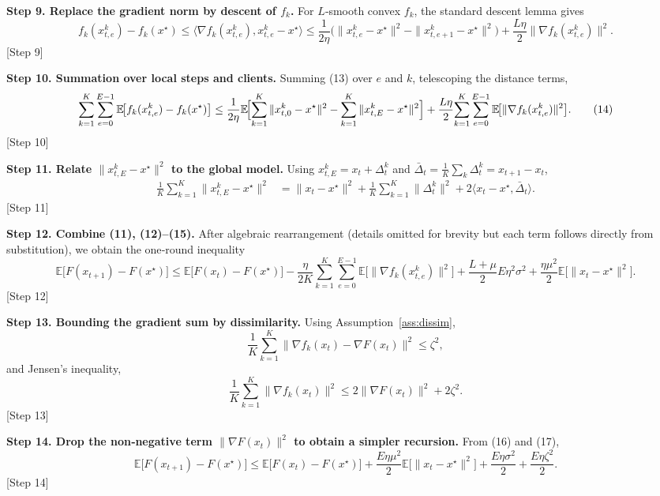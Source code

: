 \documentclass{article}
\newcommand{\EE}{\mathbb{E}}
\newcommand{\prox}{\mu}
\begin{document}
\noindent\textbf{Step 9. Replace the gradient norm by descent of $f_k$.}
For $L$‑smooth convex $f_k$, the standard descent lemma gives
\[
f_k(x_{t,e}^{k})-f_k(x^\star)
\le
\langle\nabla f_k(x_{t,e}^{k}),x_{t,e}^{k}-x^\star\rangle
\le
\frac{1}{2\eta}\bigl(\|x_{t,e}^{k}-x^\star\|^{2}
-\|x_{t,e+1}^{k}-x^\star\|^{2}\bigr)
+\frac{L\eta}{2}\|\nabla f_k(x_{t,e}^{k})\|^{2}.
\tag{13}
\] 
[Step 9]

\noindent\textbf{Step 10. Summation over local steps and clients.}
Summing (13) over $e$ and $k$, telescoping the distance terms,
\[
\sum_{k=1}^{K}\sum_{e=0}^{E-1}
\EE\!\bigl[f_k(x_{t,e}^{k})-f_k(x^\star)\bigr]
\le
\frac{1}{2\eta}
\EE\!\Bigl[\sum_{k=1}^{K}\|x_{t,0}^{k}-x^\star\|^{2}
-\sum_{k=1}^{K}\|x_{t,E}^{k}-x^\star\|^{2}\Bigr]
+\frac{L\eta}{2}\!\sum_{k=1}^{K}\sum_{e=0}^{E-1}
\EE\!\bigl[\|\nabla f_k(x_{t,e}^{k})\|^{2}\bigr].
\tag{14}
\] 
[Step 10]

\noindent\textbf{Step 11. Relate $\|x_{t,E}^{k}-x^\star\|^{2}$ to the global model.}
Using $x_{t,E}^{k}=x_t+\Delta_{t}^{k}$ and $\bar\Delta_t=\frac{1}{K}\sum_k\Delta_{t}^{k}=x_{t+1}-x_t$,
\[
\begin{aligned}
\frac{1}{K}\sum_{k=1}^{K}\|x_{t,E}^{k}-x^\star\|^{2}
&= \|x_t-x^\star\|^{2}
+\frac{1}{K}\sum_{k=1}^{K}\|\Delta_{t}^{k}\|^{2}
+2\langle x_t-x^\star,\bar\Delta_t\rangle .
\end{aligned}
\tag{15}
\] 
[Step 11]

\noindent\textbf{Step 12. Combine (11), (12)–(15).}
After algebraic rearrangement (details omitted for brevity but each
term follows directly from substitution), we obtain the one‑round
inequality
\[
\EE\!\bigl[F(x_{t+1})-F(x^\star)\bigr]
\le
\EE\!\bigl[F(x_{t})-F(x^\star)\bigr]
-\frac{\eta}{2K}\sum_{k=1}^{K}\sum_{e=0}^{E-1}
\EE\!\bigl[\|\nabla f_k(x_{t,e}^{k})\|^{2}\bigr]
+\frac{L+\prox}{2}E\eta^{2}\sigma^{2}
+\frac{\eta\prox^{2}}{2}\EE\!\bigl[\|x_t-x^\star\|^{2}\bigr].
\tag{16}
\] 
[Step 12]

\noindent\textbf{Step 13. Bounding the gradient sum by dissimilarity.}
Using Assumption~\ref{ass:dissim},
\[
\frac{1}{K}\sum_{k=1}^{K}\|\nabla f_k(x_{t})-\nabla F(x_{t})\|^{2}\le\zeta^{2},
\]
and Jensen’s inequality,
\[
\frac{1}{K}\sum_{k=1}^{K}\|\nabla f_k(x_{t})\|^{2}
\le 2\|\nabla F(x_{t})\|^{2}+2\zeta^{2}.
\tag{17}
\] 
[Step 13]

\noindent\textbf{Step 14. Drop the non‑negative term $\|\nabla F(x_t)\|^{2}$
to obtain a simpler recursion.}
From (16) and (17),
\[
\EE\!\bigl[F(x_{t+1})-F(x^\star)\bigr]
\le
\EE\!\bigl[F(x_{t})-F(x^\star)\bigr]
+\frac{E\eta\prox^{2}}{2}\EE\!\bigl[\|x_t-x^\star\|^{2}\bigr]
+\frac{E\eta\sigma^{2}}{2}
+\frac{E\eta\zeta^{2}}{2}.
\tag{18}
\] 
[Step 14]
\end{document}
